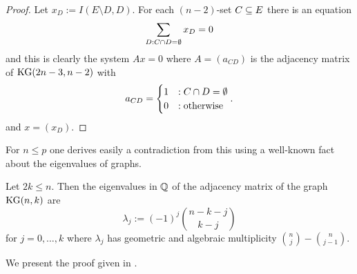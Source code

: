 \begin{proof}
    Let $x_D:=I(E\setminus D,D)$. For each $(n-2)$-set $C\subseteq E$ there is an equation
    $$
    \sum_{D:C\cap D=\emptyset}{x_D}=0
    $$
    and this is clearly the system $Ax=0$ where $A=(a_{CD})$ is the adjacency matrix of $\mathop\mathrm{KG}(2n-3,n-2)$ with
    $$
    a_{CD}=
    \begin{cases}
        1 &: C\cap D=\emptyset\\
        0 &: \textrm{otherwise}
    \end{cases}.
    $$
    and $x=(x_D)$.
\end{proof}

For $n\leq p$ one derives easily a contradiction from this using a well-known fact about the eigenvalues of  graphs.

\begin{lemma}
  Let $2k\leq n$. Then the eigenvalues in $\mathbb{Q}$ of the adjacency matrix of the  graph $\mathop\mathrm{KG}(n,k)$ are
  $$
    \lambda_j:={(-1)}^j\binom{n-k-j}{k-j}
  $$
  for $j=0,\ldots,k$ where $\lambda_j$ has geometric and algebraic multiplicity $\binom{n}{j}-\binom{n}{j-1}$.
\end{lemma}

We present the proof given in \cite{knesevals}.

